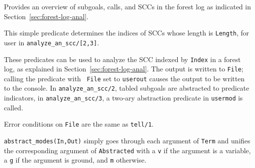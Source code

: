 \begin{description}
%
Provides an overview of subgoals, calls, and SCCs in the forest log as
indicated in Section~\ref{sec:forest-log-anal}.

%
This simple predicate  determines the indices of SCCs
whose length is {\tt Length}, for user in {\tt analyze\_an\_scc/[2,3]}.

%
These predicates can be used to analyze the SCC indexed by {\tt Index}
in a forest log, as explained in Section~\ref{sec:forest-log-anal}.
The output is written to {\tt File}; calling the predicate with {\tt
  File} set to {\tt userout} causes the output to be written to the
console.  In {\tt analyze\_an\_scc/2}, tabled subgoals are abstracted
to predicate indicators, in {\tt analyze\_an\_scc/3}, a two-ary
abstraction predicate in {\tt usermod} is called.

Error conditions on {\tt File} are the same as {\tt tell/1}.

%
{\tt abstract\_modes(In,Out)} simply goes through each argument of
{\tt Term} and unifies the corresponding argument of {\tt Abstracted}
with a {\tt v} if the argument is a variable, a {\tt g} if the
argument is ground, and {\tt m} otherwise.

\end{description}



